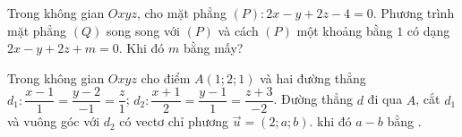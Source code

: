 \begin{ex}%
	Trong không gian $Oxyz$, cho mặt phẳng $(P)\colon 2x-y+2z-4=0$. Phương trình mặt phẳng $(Q)$ song song với $(P)$ và cách $(P)$ một khoảng bằng $1$ có dạng $2x-y+2z+m=0$. Khi đó $m$ bằng mấy?
	\par {}
\end{ex}
\begin{ex}
	Trong không gian $Oxyz$ cho điểm $ A(1;2;1) $ và hai đường thẳng $d_{1}\colon \dfrac{x-1}{1}=\dfrac{y-2}{-1}=\dfrac{z}{1}$; $d_{2}\colon \dfrac{x+1}{2}=\dfrac{y-1}{1}=\dfrac{z+3}{-2}$. Đường thẳng $ d $ đi qua $ A $, cắt $ d_1 $ và vuông góc với $ d_2 $ có vectơ chỉ phương $\overrightarrow{u}=(2;a;b)$. khi đó $a-b$ bằng . 
\end{ex}
